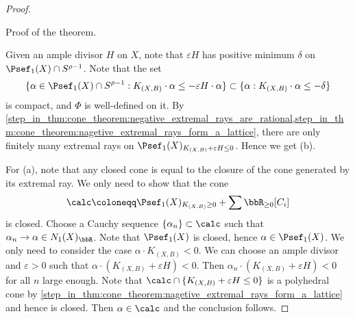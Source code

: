 \begin{proof}


        \begin{step}\label{step_in_thm:cone_theorem:finish_the_proof}
            Proof of the theorem.
        \end{step}
        Given an ample divisor \(H\) on \(X\), note that \(\varepsilon H\) has positive minimum \(\delta\) on \(\Psef_1(X) \cap S^{\rho-1}\).
        Note that the set 
        \[ \{\alpha \in \Psef_1(X)\cap S^{\rho-1} : K_{(X,B)}\cdot \alpha \leq -\varepsilon H\cdot \alpha\} \subset \{\alpha: K_{(X,B)}\cdot \alpha \leq -\delta\} \] 
        is compact, and \(\Phi\) is well-defined on it.
        By \cref{step_in_thm:cone_theorem:negative_extremal_rays_are_rational,step_in_thm:cone_theorem:nagetive_extremal_rays_form_a_lattice}, 
        there are only finitely many extremal rays on \(\Psef_1(X)_{K_{(X,B)}+\varepsilon H \leq 0}\).
        Hence we get (b).

        For (a), note that any closed cone is equal to the closure of the cone generated by its extremal ray.
        We only need to show that the cone
        \[ \calc\coloneqq \Psef_1(X)_{K_{(X,B)} \geq 0} + \sum \bbR_{\geq 0}[C_i] \]
        is closed.
        Choose a Cauchy sequence \(\{\alpha_n\} \subset \calc\) such that \(\alpha_n \to \alpha \in N_1(X)_\bbR\).
        Note that \(\Psef_1(X)\) is closed, hence \(\alpha \in \Psef_1(X)\).
        We only need to consider the case \(\alpha \cdot K_{(X,B)} < 0\).
        We can choose an ample divisor and \(\varepsilon > 0\) such that \(\alpha \cdot (K_{(X,B)}+\varepsilon H) < 0\).
        Then \(\alpha_n \cdot (K_{(X,B)}+\varepsilon H) < 0\) for all \(n\) large enough.
        Note that \(\calc \cap \{K_{(X,B)}+\varepsilon H \leq 0\}\) is a polyhedral cone by \cref{step_in_thm:cone_theorem:nagetive_extremal_rays_form_a_lattice} and hence is closed.
        Then \(\alpha \in \calc\) and the conclusion follows.
    \end{proof}
